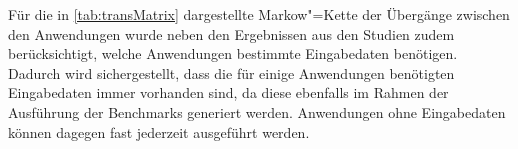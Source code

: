 Für die in \autoref{tab:transMatrix} dargestellte Markow"=Kette der Übergänge zwischen den Anwendungen wurde neben den Ergebnissen aus den Studien zudem berücksichtigt, welche Anwendungen bestimmte Eingabedaten benötigen.
Dadurch wird sichergestellt, dass die für einige Anwendungen benötigten Eingabedaten immer vorhanden sind, da diese ebenfalls im Rahmen der Ausführung der Benchmarks generiert werden.
Anwendungen ohne Eingabedaten können dagegen fast jederzeit ausgeführt werden.
